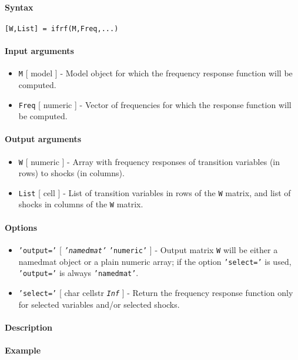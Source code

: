 


	\paragraph{Syntax}

\begin{verbatim}
[W,List] = ifrf(M,Freq,...)
\end{verbatim}

\paragraph{Input arguments}

\begin{itemize}
\item
  \texttt{M} {[} model {]} - Model object for which the frequency
  response function will be computed.
\item
  \texttt{Freq} {[} numeric {]} - Vector of frequencies for which the
  response function will be computed.
\end{itemize}

\paragraph{Output arguments}

\begin{itemize}
\item
  \texttt{W} {[} numeric {]} - Array with frequency responses of
  transition variables (in rows) to shocks (in columns).
\item
  \texttt{List} {[} cell {]} - List of transition variables in rows of
  the \texttt{W} matrix, and list of shocks in columns of the \texttt{W}
  matrix.
\end{itemize}

\paragraph{Options}

\begin{itemize}
\item
  \texttt{'output='} {[} \emph{\texttt{'namedmat'}} \textbar{}
  \texttt{'numeric'} {]} - Output matrix \texttt{W} will be either a
  namedmat object or a plain numeric array; if the option
  \texttt{'select='} is used, \texttt{'output='} is always
  \texttt{'namedmat'}.
\item
  \texttt{'select='} {[} char \textbar{} cellstr \textbar{}
  \emph{\texttt{Inf}} {]} - Return the frequency response function only
  for selected variables and/or selected shocks.
\end{itemize}

\paragraph{Description}

\paragraph{Example}


